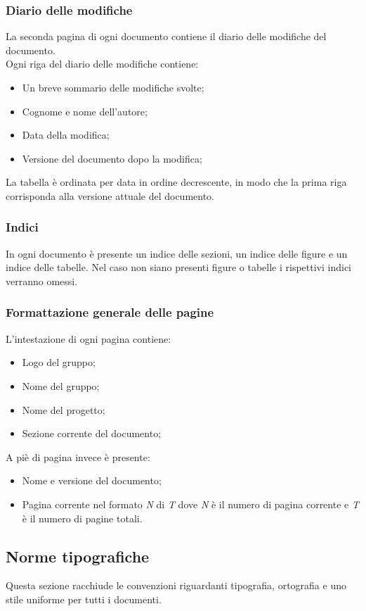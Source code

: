       \subsubsection{Diario delle modifiche}
        La seconda pagina di ogni documento contiene il diario delle modifiche del documento.\\
        Ogni riga del diario delle modifiche contiene:
        \begin{itemize}
          \item Un breve sommario delle modifiche svolte;
          \item Cognome e nome dell’autore;
          \item Data della modifica;
          \item Versione del documento dopo la modifica;
        \end{itemize}
        La tabella è ordinata per data in ordine decrescente, in modo che la prima riga corrisponda alla versione attuale del documento.
      \subsubsection{Indici}
        In ogni documento è presente un indice delle sezioni, un indice delle figure e un indice delle tabelle.
        Nel caso non siano presenti figure o tabelle i rispettivi indici verranno omessi.
      \subsubsection{Formattazione generale delle pagine}
        L’intestazione di ogni pagina contiene:
        \begin{itemize}
          \item Logo del gruppo;
          \item Nome del gruppo;
          \item Nome del progetto;
          \item Sezione corrente del documento;
        \end{itemize}
        A piè di pagina invece è presente:
        \begin{itemize}
          \item Nome e versione del documento;
          \item Pagina corrente nel formato \emph{N} di \emph{T} dove \emph{N} è il numero di pagina corrente e \emph{T} è il numero di pagine totali.
        \end{itemize}
    \subsection{Norme tipografiche}
      Questa sezione racchiude le convenzioni riguardanti tipografia, ortografia e uno stile uniforme per tutti i documenti.
